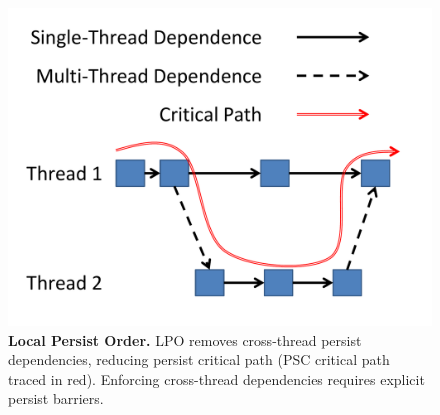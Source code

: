 \begin{figure}
\centering
\includegraphics[width=.7\textwidth]{PMC/LPO.pdf}
\caption{\textbf{Local Persist Order.} LPO removes cross-thread persist dependencies, reducing persist critical path (PSC critical path traced in red).  Enforcing cross-thread dependencies requires explicit persist barriers.}
\label{figure:LPO}
\end{figure}
